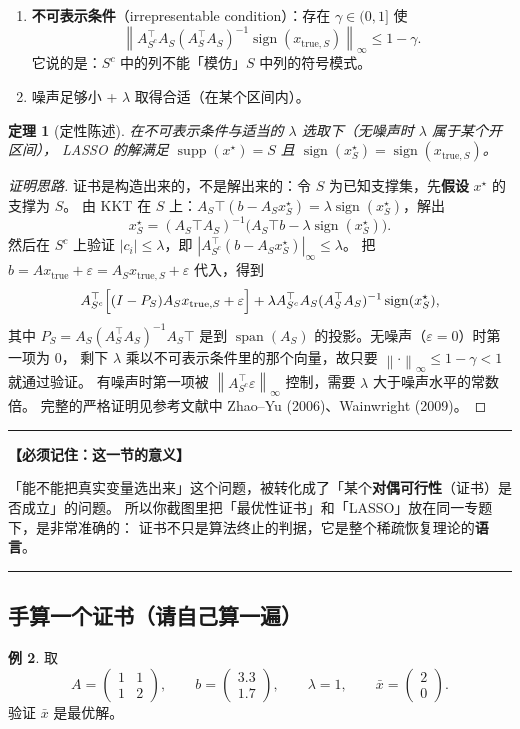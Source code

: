 \documentclass[11pt,a4paper,UTF8]{ctexart}
\theoremstyle{plain}
\newtheorem{theorem}{定理}[section]
\theoremstyle{definition}
\newtheorem{example}[theorem]{例}
\theoremstyle{remark}
\newcommand{\norm}[1]{\left\lVert #1 \right\rVert}
\newcommand{\abs}[1]{\left\lvert #1 \right\rvert}
\newcommand{\spn}{\operatorname{span}}
\newcommand{\supp}{\operatorname{supp}}
\DeclareMathOperator{\sign}{sign}
\newcommand{\tp}{^{\top}}
\newcommand{\eps}{\varepsilon}
\newenvironment{keypoint}[1]
  {\par\medskip\noindent\begin{minipage}{\linewidth}%
   \hrule\smallskip\noindent\textbf{【必须记住：#1】}\par\nopagebreak\smallskip}
  {\smallskip\hrule\end{minipage}\medskip}
\begin{document}
\begin{enumerate}
\item \textbf{不可表示条件}（irrepresentable condition）：存在 $\gamma\in(0,1]$ 使
\[
\norm{A_{S^c}\tp A_S(A_S\tp A_S)^{-1}\sign(x_{\mathrm{true},S})}_\infty\le1-\gamma .
\]
它说的是：$S^c$ 中的列不能「模仿」$S$ 中列的符号模式。
\item 噪声足够小 + $\lambda$ 取得合适（在某个区间内）。
\end{enumerate}

\begin{theorem}[定性陈述]
在不可表示条件与适当的 $\lambda$ 选取下（无噪声时 $\lambda$ 属于某个开区间），
LASSO 的解满足 $\supp(x^\star)=S$ 且 $\sign(x^\star_S)=\sign(x_{\mathrm{true},S})$。
\end{theorem}

\begin{proof}[证明思路]
证书是构造出来的，不是解出来的：令 $S$ 为已知支撑集，先\textbf{假设} $x^\star$ 的支撑为 $S$。
由 KKT 在 $S$ 上：$A_S\top(b-A_Sx_S^\star)=\lambda\sign(x^\star_S)$，解出
\[
x_S^\star=(A_S\top A_S)^{-1}\bigl(A_S\top b-\lambda\sign(x_S^\star)\bigr).
\]
然后在 $S^c$ 上验证 $\abs{c_i}\le\lambda$，即
$\abs{A_{S^c}\tp(b-A_Sx_S^\star)}_\infty\le\lambda$。
把 $b=Ax_{\mathrm{true}}+\eps=A_Sx_{\mathrm{true},S}+\eps$ 代入，得到
\[
A_{S^c}\tp\Bigl[(I-P_S)A_Sx_{\mathrm{true},S}+\eps\Bigr]+\lambda A_{S^c}\tp A_S(A_S\tp A_S)^{-1}\sign(x_S^\star),
\]
其中 $P_S=A_S(A_S\tp A_S)^{-1}A_S\top$ 是到 $\spn(A_S)$ 的投影。无噪声（$\eps=0$）时第一项为 $0$，
剩下 $\lambda$ 乘以不可表示条件里的那个向量，故只要 $\norm{\cdot}_\infty\le1-\gamma<1$ 就通过验证。
有噪声时第一项被 $\norm{A_{S^c}\tp\eps}_\infty$ 控制，需要 $\lambda$ 大于噪声水平的常数倍。
完整的严格证明见参考文献中 Zhao--Yu (2006)、Wainwright (2009)。
\end{proof}

\begin{keypoint}{这一节的意义}
「能不能把真实变量选出来」这个问题，被转化成了「某个\textbf{对偶可行性}（证书）是否成立」的问题。
所以你截图里把「最优性证书」和「LASSO」放在同一专题下，是非常准确的：
证书不只是算法终止的判据，它是整个稀疏恢复理论的\textbf{语言}。
\end{keypoint}

\subsection{手算一个证书（请自己算一遍）}

\begin{example}\label{ex:cert}
取
\[
A=\begin{pmatrix}1&1\\1&2\end{pmatrix},\qquad
b=\begin{pmatrix}3.3\\1.7\end{pmatrix},\qquad
\lambda=1,\qquad
\bar x=\begin{pmatrix}2\\0\end{pmatrix}.
\]
验证 $\bar x$ 是最优解。
\end{example}
\end{document}
